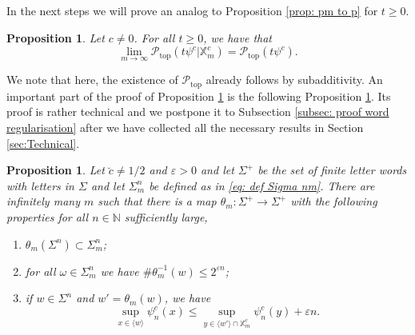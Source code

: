 \documentclass[11pt,reqno]{amsart}
\theoremstyle{plain}
\newtheorem{prop}[theorem]{Proposition}
\theoremstyle{definition}
\newcommand{\N}{{\mathbb N}}
\newcommand{\mc}{\mathcal}
\begin{document}
In the next steps we will prove an analog to Proposition \ref{prop: pm to p} for $t\geqslant 0$.
\begin{prop}\label{prop: PtopmtoPtop}
Let $c \neq 0$. For all $t \geqslant 0$, we have that
\[
\lim_{m \to \infty} \mc P_{\operatorname{top}} (t \psi^c | \mathbb{X}^c_m) = \mc P_{\operatorname{top}}(t \psi^c).
\]
\end{prop}
We note that here, the existence of $\mc P_{\operatorname{top}}$ already follows by subadditivity.
An important part of the proof of Proposition \ref{prop: PtopmtoPtop} is the following Proposition \ref{PROP:word-regularisation}. Its proof is rather technical and we postpone it to Subsection \ref{subsec: proof word regularisation} after we have collected all the necessary results in Section \ref{sec:Technical}.


\begin{prop}
\label{PROP:word-regularisation}
Let $\breve{c} \neq 1/2$ and $\varepsilon > 0$ and let $\Sigma^+$ be the set of finite letter words with letters in $\Sigma$ and let $\Sigma^n_m$ be defined as in \eqref{eq: def Sigma nm}. There are infinitely many $m$ such that there is a map $\theta_m \colon \Sigma^+ \to \Sigma^+$ with the following properties for all $n \in \N$ sufficiently large,
\begin{enumerate}
\item $\theta_m(\Sigma^n) \subset \Sigma^n_m$;
\item for all $\omega\in \Sigma^n_m$ we have $ \# \theta_m^{-1}(w) \leqslant 2^{\varepsilon n}$;
\item if $w \in \Sigma^n$ and $w'= \theta_m(w)$, we have 
\[
\sup_{x \in \langle w \rangle} \psi^c_n(x)
\leqslant
\sup_{y \in \langle w'  \rangle \cap \mathbb{X}_m^c } \psi^c_n(y) + \varepsilon n.
\]
\end{enumerate}
\end{prop}
\end{document}

